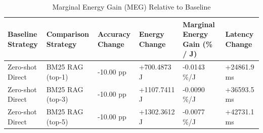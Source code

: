 \begin{table}
\caption{Marginal Energy Gain (MEG) Relative to Baseline}
\label{tab:marginal_energy_gain}
\begin{tabular}{llllll}
\toprule
Baseline Strategy & Comparison Strategy & Accuracy Change & Energy Change & Marginal Energy Gain (\% / J) & Latency Change \\
\midrule
Zero-shot Direct & BM25 RAG (top-1) & -10.00 pp & +700.4873 J & -0.0143 \%/J & +24861.9 ms \\
Zero-shot Direct & BM25 RAG (top-3) & -10.00 pp & +1107.7411 J & -0.0090 \%/J & +36593.5 ms \\
Zero-shot Direct & BM25 RAG (top-5) & -10.00 pp & +1302.3612 J & -0.0077 \%/J & +42731.1 ms \\
\bottomrule
\end{tabular}
\end{table}
